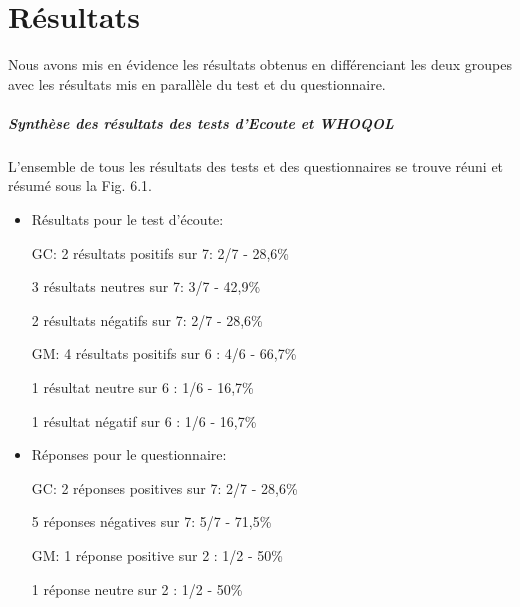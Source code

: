  	
 	
 
%                                 
                                 
  
  
   \chapter{Résultats}
   Nous avons mis en évidence les résultats obtenus en différenciant les deux groupes avec les résultats 
   mis en parallèle du test et du questionnaire.
   
    \paragraph{Synthèse  des résultats  des tests d'Ecoute et WHOQOL}
    
 
  L'ensemble de tous les résultats des tests et des questionnaires se trouve réuni et résumé 
  	sous  la Fig. 6.1.
   \begin{itemize}
   	
  	 \item Résultats pour le test d'écoute: 
  
  GC: 2 résultats positifs sur 7:       2/7 - 28,6\%
  
  
  		  3 résultats neutres sur 7:			3/7 - 42,9\%
  		  
  		  
  		  2 résultats négatifs sur 7:		2/7 - 28,6\%
  		  
  		  
  GM: 4 résultats positifs sur 6    :       4/6 - 66,7\%
  
  
  		  1 résultat neutre sur 6 : 			1/6 - 16,7\%
  		  
  		  
  		  1 résultat négatif sur 6 : 		     1/6 - 16,7\%
  		  
  		  
  
  \item Réponses pour le questionnaire:    
  
   GC: 2 réponses positives sur 7:       2/7  - 28,6\%
   
   
   			5 réponses négatives sur 7: 	5/7 - 71,5\%
   			
   			
  GM: 1 réponse positive sur 2    :       1/2 - 50\%
  
  
  		  1 réponse neutre sur 2 : 			1/2 - 50\%
  		  
  
   \end{itemize}




